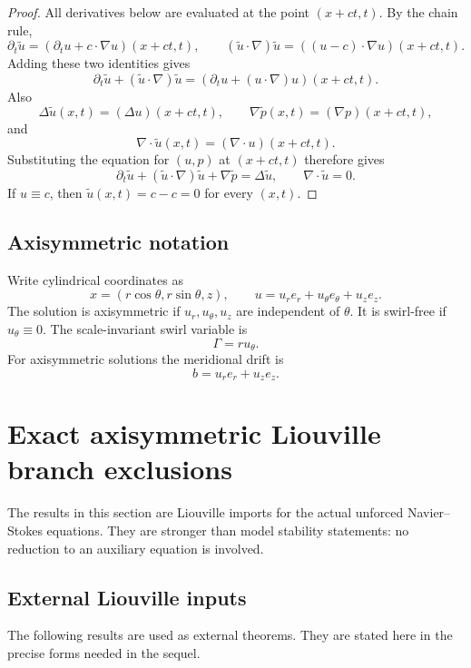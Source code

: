 \documentclass[11pt]{amsart}
\theoremstyle{plain}
\theoremstyle{definition}
\theoremstyle{remark}
\numberwithin{equation}{section}
\begin{document}
\begin{proof}
All derivatives below are evaluated at the point \((x+ct,t)\).  By the chain
rule,
\[
   \partial_t\widetilde u
   =
   (\partial_tu+c\cdot\nabla u)(x+ct,t),
   \qquad
   (\widetilde u\cdot\nabla)\widetilde u
   =
   ((u-c)\cdot\nabla u)(x+ct,t).
\]
Adding these two identities gives
\[
   \partial_t\widetilde u+(\widetilde u\cdot\nabla)\widetilde u
   =
   (\partial_tu+(u\cdot\nabla)u)(x+ct,t).
\]
Also
\[
   \Delta\widetilde u(x,t)=(\Delta u)(x+ct,t),
   \qquad
   \nabla\widetilde p(x,t)=(\nabla p)(x+ct,t),
\]
and
\[
   \nabla\cdot\widetilde u(x,t)
   =
   (\nabla\cdot u)(x+ct,t).
\]
Substituting the equation for \((u,p)\) at \((x+ct,t)\) therefore gives
\[
   \partial_t\widetilde u+(\widetilde u\cdot\nabla)\widetilde u
      +\nabla\widetilde p
   =
   \Delta\widetilde u,
   \qquad
   \nabla\cdot\widetilde u=0 .
\]
If \(u\equiv c\), then \(\widetilde u(x,t)=c-c=0\) for every \((x,t)\).
\end{proof}

\subsection{Axisymmetric notation}

Write cylindrical coordinates as
\[
   x=(r\cos\theta,r\sin\theta,z),\qquad
   u=u_r e_r+u_\theta e_\theta+u_z e_z .
\]
The solution is axisymmetric if \(u_r,u_\theta,u_z\) are independent of
\(\theta\).  It is swirl-free if \(u_\theta\equiv0\).  The scale-invariant
swirl variable is
\[
   \Gamma=r u_\theta .
\]
For axisymmetric solutions the meridional drift is
\[
   b=u_r e_r+u_z e_z .
\]

\section{Exact axisymmetric Liouville branch exclusions}

The results in this section are Liouville imports for the actual unforced
Navier--Stokes equations.  They are stronger than model stability statements:
no reduction to an auxiliary equation is involved.

\subsection{External Liouville inputs}

The following results are used as external theorems.  They are stated here in
the precise forms needed in the sequel.
\end{document}
